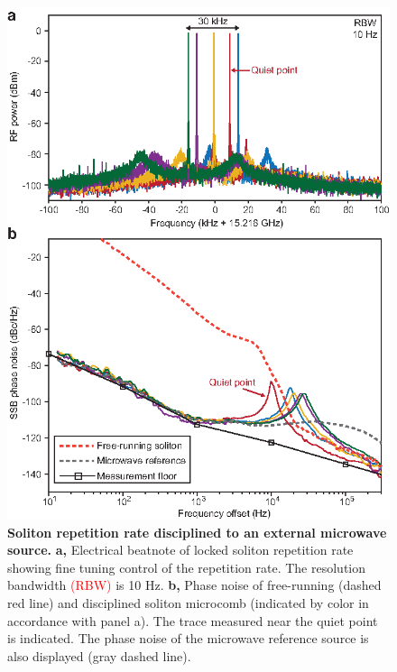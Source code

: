 \documentclass[noshowpacs,amsmath,
twocolumn,
superscriptaddress,
8pt,
aps,prb]{revtex4-2}
\begin{document}
\begin{figure}[!ht]
\centering
\includegraphics[width=\linewidth]{Fig6.eps}
\caption{{\bf Soliton repetition rate disciplined to an external microwave source.} {\bf a,} Electrical beatnote of locked soliton repetition rate showing fine tuning control of the repetition rate. The resolution bandwidth \textcolor{red}{(RBW)} is 10 Hz. {\bf b,} Phase noise of free-running (dashed red line) and disciplined soliton microcomb (indicated by color in accordance with panel a). The trace measured near the quiet point is indicated. The phase noise of the microwave reference source is also displayed (gray dashed line).}
\label{figure6}
\end{figure}
\end{document}
